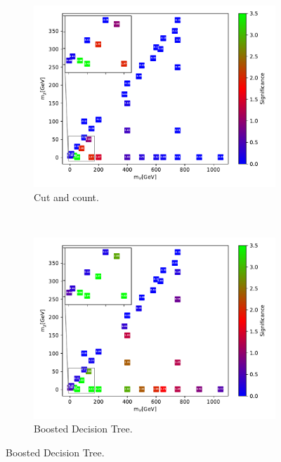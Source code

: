 \begin{figure}[H]
    \centering
    \begin{subfigure}[t!]{0.49\textwidth}
    \includegraphics[width = \textwidth]{Figures/Significances/significanceCutandCount_monoZ_all.pdf}
    \caption{Cut and count.}
        \label{fig:signLowmonoZcandc}
    \end{subfigure}
    \\
    \begin{subfigure}[t!]{0.49\textwidth}
    \includegraphics[width = \textwidth]{Figures/Significances/significance_BDT_monoZ_Low_level.pdf}
    \caption{Boosted Decision Tree.}
        \label{fig:signLowmonoZBDT}
    \end{subfigure}      

\end{figure}
